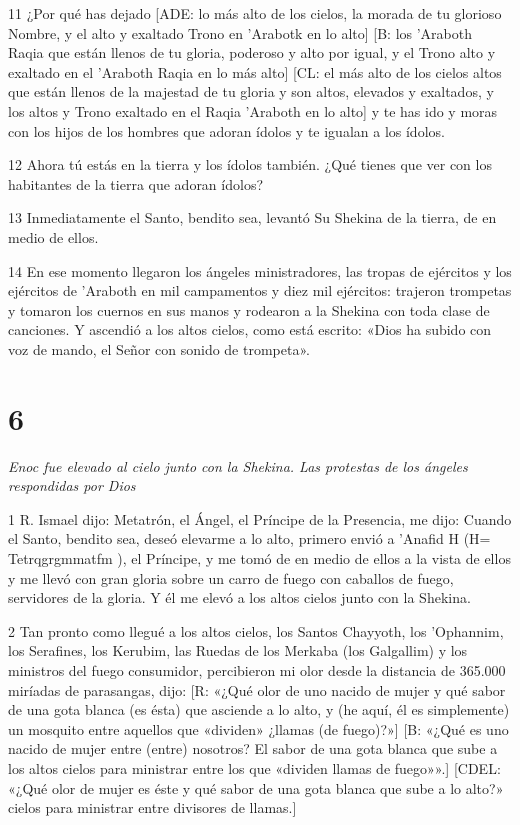 \par 11 ¿Por qué has dejado [ADE: lo más alto de los cielos, la morada de tu glorioso Nombre, y el alto y exaltado Trono en 'Arabotk en lo alto] [B: los 'Araboth Raqia que están llenos de tu gloria, poderoso y alto por igual, y el Trono alto y exaltado en el 'Araboth Raqia en lo más alto] [CL: el más alto de los cielos altos que están llenos de la majestad de tu gloria y son altos, elevados y exaltados, y los altos y Trono exaltado en el Raqia 'Araboth en lo alto] y te has ido y moras con los hijos de los hombres que adoran ídolos y te igualan a los ídolos.

\par 12 Ahora tú estás en la tierra y los ídolos también. ¿Qué tienes que ver con los habitantes de la tierra que adoran ídolos?

\par 13 Inmediatamente el Santo, bendito sea, levantó Su Shekina de la tierra, de en medio de ellos.

\par 14 En ese momento llegaron los ángeles ministradores, las tropas de ejércitos y los ejércitos de 'Araboth en mil campamentos y diez mil ejércitos: trajeron trompetas y tomaron los cuernos en sus manos y rodearon a la Shekina con toda clase de canciones. Y ascendió a los altos cielos, como está escrito: «Dios ha subido con voz de mando, el Señor con sonido de trompeta».

\chapter{6}

\par \textit{Enoc fue elevado al cielo junto con la Shekina. Las protestas de los ángeles respondidas por Dios}

\par 1 R. Ismael dijo: Metatrón, el Ángel, el Príncipe de la Presencia, me dijo: Cuando el Santo, bendito sea, deseó elevarme a lo alto, primero envió a 'Anafid H (H= Tetrqgrgmmatfm ), el Príncipe, y me tomó de en medio de ellos a la vista de ellos y me llevó con gran gloria sobre un carro de fuego con caballos de fuego, servidores de la gloria. Y él me elevó a los altos cielos junto con la Shekina.

\par 2 Tan pronto como llegué a los altos cielos, los Santos Chayyoth, los 'Ophannim, los Serafines, los Kerubim, las Ruedas de los Merkaba (los Galgallim) y los ministros del fuego consumidor, percibieron mi olor desde la distancia de 365.000 miríadas de parasangas, dijo: [R: «¿Qué olor de uno nacido de mujer y qué sabor de una gota blanca (es ésta) que asciende a lo alto, y (he aquí, él es simplemente) un mosquito entre aquellos que «dividen» ¿llamas (de fuego)?»] [B: «¿Qué es uno nacido de mujer entre (entre) nosotros? El sabor de una gota blanca que sube a los altos cielos para ministrar entre los que «dividen llamas de fuego»».] [CDEL: «¿Qué olor de mujer es éste y qué sabor de una gota blanca que sube a lo alto?» cielos para ministrar entre divisores de llamas.]

